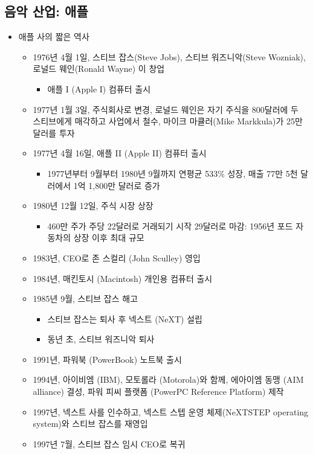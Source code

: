 \subsection{음악 산업: 애플}
\begin{itemize}
\item 애플 사의 짧은 역사
	\begin{itemize}
	\item 1976년 4월 1일, 스티브 잡스(Steve Jobs), 스티브 워즈니악(Steve Wozniak), 로널드 웨인(Ronald Wayne) 이 창업
		\begin{itemize}
		\item 애플 I (Apple I) 컴퓨터 출시
		\end{itemize}
	\item 1977년 1월 3일, 주식회사로 변경, 로널드 웨인은 자기 주식을 800달러에 두 스티브에게 매각하고 사업에서 철수, 마이크 마큘러(Mike Markkula)가 25만 달러를 투자
	\item 1977년 4월 16일, 애플 II (Apple II) 컴퓨터 출시
		\begin{itemize}
		\item 1977년부터 9월부터 1980년 9월까지 연평균 533\% 성장, 매출 77만 5천 달러에서 1억 1,800만 달러로 증가
		\end{itemize}
	\item 1980년 12월 12일, 주식 시장 상장
		\begin{itemize}
		\item 460만 주가 주당 22달러로 거래되기 시작 29달러로 마감: 1956년 포드 자동차의 상장 이후 최대 규모
		\end{itemize}
	\item 1983년, CEO로 존 스컬리 (John Sculley) 영입
	\item 1984년, 매킨토시 (Macintosh) 개인용 컴퓨터 출시
	\item 1985년 9월, 스티브 잡스 해고
		\begin{itemize}
		\item 스티브 잡스는 퇴사 후 넥스트 (NeXT) 설립
		\item 동년 초, 스티브 워즈니악 퇴사
		\end{itemize}
	\item 1991년, 파워북 (PowerBook) 노트북 출시
	\item 1994년, 아이비엠 (IBM), 모토롤라 (Motorola)와 함께, 에아이엠 동맹 (AIM alliance) 결성, 파워 피씨 플랫폼 (PowerPC Reference Platform) 제작 
	\item 1997년, 넥스트 사를 인수하고, 넥스트 스텝 운영 체제(NeXTSTEP operating system)와 스티브 잡스를 재영입
	\item 1997년 7월, 스티브 잡스 임시 CEO로 복귀

\end{itemize}
\end{itemize}
